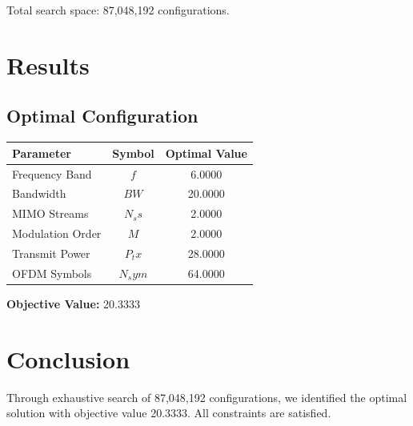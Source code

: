 \documentclass[11pt,a4paper]{article}
\begin{document}
Total search space: 87,048,192 configurations.

\section{Results}

\subsection{Optimal Configuration}

\begin{center}
\begin{tabular}{|l|c|c|}
\hline
Parameter & Symbol & Optimal Value \\
\hline
Frequency Band & $f$ & 6.0000 \\
Bandwidth & $BW$ & 20.0000 \\
MIMO Streams & $N_ss$ & 2.0000 \\
Modulation Order & $M$ & 2.0000 \\
Transmit Power & $P_tx$ & 28.0000 \\
OFDM Symbols & $N_sym$ & 64.0000 \\
\hline
\end{tabular}
\end{center}

\textbf{Objective Value:} 20.3333

\section{Conclusion}

Through exhaustive search of 87,048,192 configurations, we identified the optimal solution with objective value 20.3333. All constraints are satisfied.
\end{document}
